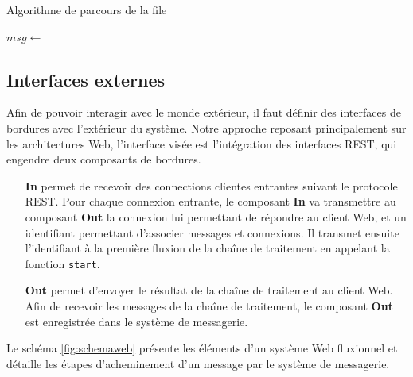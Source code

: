 \begin{algorithm}
\caption{Algorithme de parcours de la file}
\label{alg:parcours}
\begin{algorithmic}
\State $msg \gets$  
\State {}
\EndWhile
\EndFunction
\end{algorithmic}
\end{algorithm}

\subsection{Interfaces externes}

Afin de pouvoir interagir avec le monde extérieur, il faut définir des interfaces de bordures avec l'extérieur du système.
Notre approche reposant principalement sur les architectures Web, l'interface visée est l'intégration des interfaces REST, qui engendre deux composants de bordures.


\begin{itemize}
	\item[\textbf{In}]
    permet de recevoir des connections clientes entrantes suivant le protocole REST.
    Pour chaque connexion entrante, le composant \textbf{In} va transmettre au composant \textbf{Out} la connexion lui permettant de répondre au client Web, et un identifiant permettant d'associer messages et connexions.
    Il transmet ensuite l'identifiant à la première fluxion de la chaîne de traitement en appelant la fonction \texttt{start}.
	\item[\textbf{Out}]
    permet d'envoyer le résultat de la chaîne de traitement au client Web.
    Afin de recevoir les messages de la chaîne de traitement, le composant \textbf{Out} est enregistrée dans le système de messagerie.
\end{itemize}


Le schéma \ref{fig:schemaweb} présente les éléments d'un système Web fluxionnel et détaille les étapes d'acheminement d'un message par le système de messagerie.

